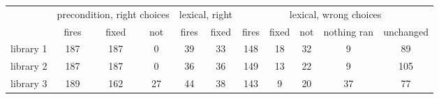 \begin{tabular}{lcccccccccc}
\toprule
& \multicolumn{3}{c}{precondition, right choices} & \multicolumn{2}{c}{lexical, right} & \multicolumn{5}{c}{lexical, wrong choices} \\
\cmidrule(lr){2-4}\cmidrule(lr){5-6}\cmidrule(lr){7-11}
& fires & fixed & not & fires & fixed & fires & fixed & not & nothing ran & unchanged \\
\midrule
library 1 & 187 & 187 & 0 & 39 & 33 & 148 & 18 & 32 & 9 & 89 \\
library 2 & 187 & 187 & 0 & 36 & 36 & 149 & 13 & 22 & 9 & 105 \\
library 3 & 189 & 162 & 27 & 44 & 38 & 143 & 9 & 20 & 37 & 77 \\
\bottomrule
\end{tabular}
